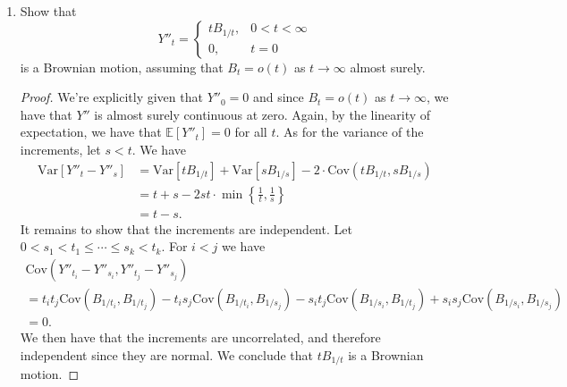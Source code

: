 \documentclass[11pt,letterpaper]{report}
\newcommand{\E}{\mathbb{E}}
\newcommand{\Var}{\text{Var}}
\newcommand{\Cov}{\text{Cov}}
\begin{document}
\begin{enumerate}[(a.)]
	\item Show that
	\[
	Y''_t = \begin{cases}
		tB_{1/t},&0<t<\infty\\
		0,&t=0
	\end{cases}
	\]
	is a Brownian motion, assuming that $B_t = o(t)$ as $t\to \infty$ almost surely.
	\begin{proof}
		We're explicitly given that $Y''_0 = 0$ and since $B_t = o(t)$ as $t\to \infty$, we have that $Y''$ is almost surely continuous at zero. Again, by the linearity of expectation, we have that $\E[Y''_t] = 0$ for all $t$. As for the variance of the increments, let $s<t$. We have
		\begin{align*}
			\Var[Y''_t-Y''_s] &= \Var[tB_{1/t}] + \Var[sB_{1/s}] - 2\cdot \Cov(tB_{1/t}, sB_{1/s})\\
			&= t + s - 2st\cdot \min\left\{\frac{1}{t}, \frac{1}{s}\right\}\\
			&= t-s.
		\end{align*}
		It remains to show that the increments are independent. Let $0<s_1<t_1\leq \cdots \leq s_k<t_k$. For $i<j$ we have
		\begin{align*}
			\Cov(Y''_{t_i}-Y''_{s_i}, Y''_{t_j}-Y''_{s_j})&\\
			= t_it_j\Cov(B_{1/t_i}, B_{1/t_j}) - t_is_j\Cov(B_{1/t_i}, B_{1/s_j}) - s_it_j\Cov(B_{1/s_i}, B_{1/t_j}) + s_is_j\Cov(B_{1/s_i}, B_{1/s_j})\\
			= 0.
		\end{align*}
		We then have that the increments are uncorrelated, and therefore independent since they are normal. We conclude that $tB_{1/t}$ is a Brownian motion.
	\end{proof}
\end{enumerate}
\end{document}
